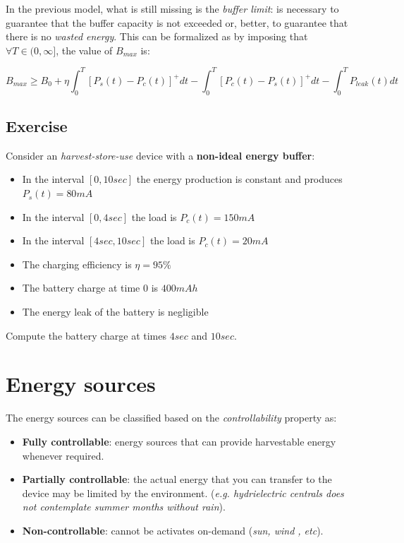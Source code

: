 \documentclass[10pt,a4paper]{report}
\theoremstyle{definition}
\begin{document}
In the previous model, what is still missing is the \textit{buffer limit}: is necessary to guarantee that the buffer capacity is not exceeded or, better, to guarantee that there is no \textit{wasted energy}. This can be formalized as by imposing that $\forall T \in (0,\infty]$, the value of $B_{max}$ is:

\begin{equation}
B_{max} \geq B_{0}+\eta \int_{0}^{T} [P_{s}(t) - P_{c}(t)]^{+}dt - \int_{0}^{T} [P_{c}(t) - P_{s}(t)]^{+}dt - \int_{0}^{T} P_{leak}(t)dt
\end{equation}

\subsection{Exercise}\label{sec:exercise}
Consider an \textit{harvest-store-use} device with a \textbf{non-ideal energy buffer}:
\begin{itemize}
	\item 
	In the interval $[0, 10sec]$ the energy production is constant and produces $P_{s}(t) = 80 mA$
	\item 
	In the interval $[0, 4sec]$ the load is $P_{c}(t) = 150 mA$
	\item 
	In the interval $[4sec, 10sec]$ the load is $P_{c}(t) = 20 mA$
	\item 
	The charging efficiency is $\eta = 95\%$
	\item 
	The battery charge at time $0$ is $400 mAh$
	\item 
	The energy leak of the battery is negligible

\end{itemize}
Compute the battery charge at times $4sec$ and $10sec$.



\section{Energy sources}\label{sec:energy-sources}
The energy sources can be classified based on the \textit{controllability} property as:
\begin{itemize}
	\item 
	\textbf{Fully controllable}: energy sources that can provide harvestable energy whenever required.
	\item 
	\textbf{Partially controllable}: the actual energy that you can transfer to the device may be limited by the environment. (\textit{e.g. hydrielectric centrals does not contemplate summer months without rain}).
	\item 
	\textbf{Non-controllable}: cannot be activates on-demand (\textit{sun, wind , etc}).
\end{itemize}
\end{document}

